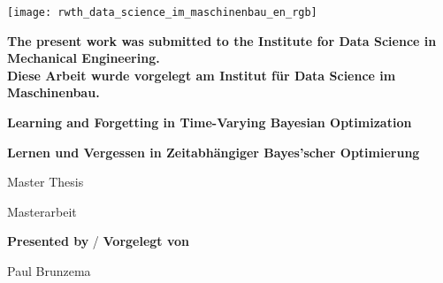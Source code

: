 \begin{titlepage}
    
    
    
    {\vspace*{-5cm}\hspace{2.3cm}
    \texttt{[image: rwth\_data\_science\_im\_maschinenbau\_en\_rgb]}}
    
    \begin{adjustwidth}{-1.8cm}{-1.8cm}
    \noindent\textbf{The present work was submitted to the Institute for Data Science in Mechanical Engineering.}\\
    \textcolor{black!60}{\textbf{Diese Arbeit wurde vorgelegt am Institut für Data Science im Maschinenbau.}}
    
    
    \vspace{2.8cm}

    \Large
    \noindent\textbf{Learning and Forgetting in Time-Varying Bayesian Optimization}

    \noindent\textcolor{black!60}{\textbf{Lernen und Vergessen in Zeitabhängiger Bayes'scher Optimierung}}
    
    \vspace{2cm}
    
    \noindent Master Thesis

    \noindent\textcolor{black!60}{Masterarbeit}

    \vspace{2.2cm}
    \large
    
    \noindent \textbf{Presented by} / \textcolor{black!60}{\textbf{Vorgelegt von}}
    
    \vspace{0.4cm}
    \noindent Paul Brunzema\\

    \vspace{1.2cm}


\end{adjustwidth}
\end{titlepage}
